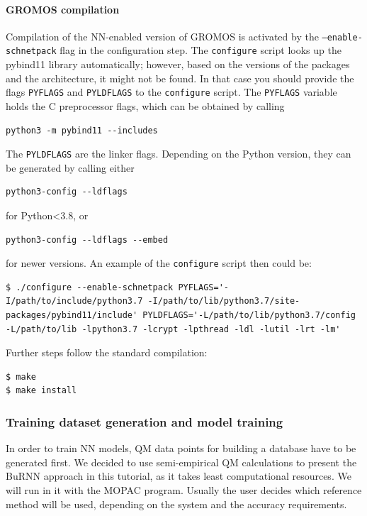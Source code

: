 \paragraph{GROMOS compilation}
Compilation of the NN-enabled version of GROMOS is activated by the \texttt{--enable-schnetpack} flag in the configuration step. The \texttt{configure} script looks up the pybind11 library automatically; however, based on the versions of the packages and the architecture, it might not be found. In that case you should provide the flags \texttt{PYFLAGS} and \texttt{PYLDFLAGS} to the \texttt{configure} script. The \texttt{PYFLAGS} variable holds the C preprocessor flags, which can be obtained by calling

\begin{lstlisting}[breaklines=true, breakatwhitespace=false]
python3 -m pybind11 --includes
\end{lstlisting}

The \texttt{PYLDFLAGS} are the linker flags. Depending on the Python version, they can be generated by calling either 

\begin{lstlisting}[breaklines=true, breakatwhitespace=false]
python3-config --ldflags
\end{lstlisting}

for Python<3.8, or 

\begin{lstlisting}[breaklines=true, breakatwhitespace=false]
python3-config --ldflags --embed
\end{lstlisting}

for newer versions. An example of the \texttt{configure} script then could be:
\begin{lstlisting}[breaklines=true, breakatwhitespace=false]
$ ./configure --enable-schnetpack PYFLAGS='-I/path/to/include/python3.7 -I/path/to/lib/python3.7/site-packages/pybind11/include' PYLDFLAGS='-L/path/to/lib/python3.7/config -L/path/to/lib -lpython3.7 -lcrypt -lpthread -ldl -lutil -lrt -lm'
\end{lstlisting}

Further steps follow the standard compilation:
\begin{lstlisting}[breaklines=true, breakatwhitespace=false]
$ make
$ make install
\end{lstlisting}


\subsubsection{Training dataset generation and model training}
In order to train NN models, QM data points for building a database have to be generated first. We decided to use semi-empirical QM calculations to present the BuRNN approach in this tutorial, as it takes least computational resources. We will run in it with the MOPAC \cite{Stewart1990MOPAC, Stewart2013MOPAC} program. Usually the user decides which reference method will be used, depending on the system and the accuracy requirements.

